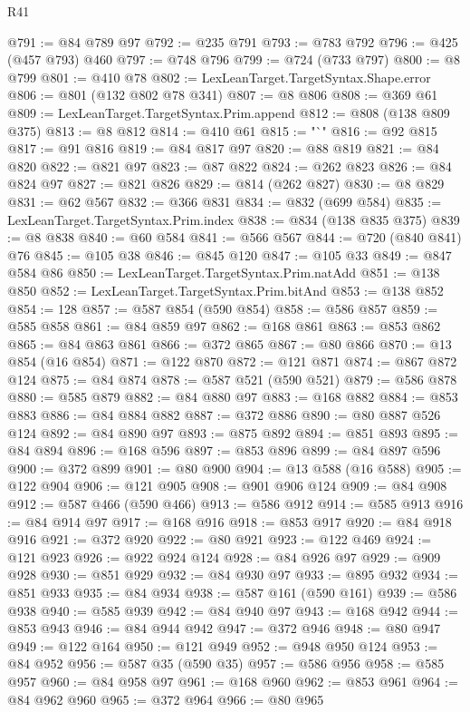 \begin{lexlean}{R41}
\begin{coremodule}
{{{{{{{{{{{{{{{{{{{{{{{{{{{{{{{{{{{{{{{{{{{{{{{{{{{{{{{{{{{{{{{{{{{{{{{{{{{{{{{{{{{{{{{@791 := @84 @789 @97
@792 := @235 @791
@793 := @783 @792
@796 := @425 (@457 @793) @460
@797 := @748 @796
@799 := @724 (@733 @797)
@800 := @8 @799
@801 := @410 @78
@802 := LexLeanTarget.TargetSyntax.Shape.error
@806 := @801 (@132 @802 @78 @341)
@807 := @8 @806
@808 := @369 @61
@809 := LexLeanTarget.TargetSyntax.Prim.append
@812 := @808 (@138 @809 @375)
@813 := @8 @812
@814 := @410 @61
@815 := "`"
@816 := @92 @815
@817 := @91 @816
@819 := @84 @817 @97
@820 := @88 @819
@821 := @84 @820
@822 := @821 @97
@823 := @87 @822
@824 := @262 @823
@826 := @84 @824 @97
@827 := @821 @826
@829 := @814 (@262 @827)
@830 := @8 @829
@831 := @62 @567
@832 := @366 @831
@834 := @832 (@699 @584)
@835 := LexLeanTarget.TargetSyntax.Prim.index
@838 := @834 (@138 @835 @375)
@839 := @8 @838
@840 := @60 @584
@841 := @566 @567
@844 := @720 (@840 @841) @76
@845 := @105 @38
@846 := @845 @120
@847 := @105 @33
@849 := @847 @584 @86
@850 := LexLeanTarget.TargetSyntax.Prim.natAdd
@851 := @138 @850
@852 := LexLeanTarget.TargetSyntax.Prim.bitAnd
@853 := @138 @852
@854 := 128
@857 := @587 @854 (@590 @854)
@858 := @586 @857
@859 := @585 @858
@861 := @84 @859 @97
@862 := @168 @861
@863 := @853 @862
@865 := @84 @863 @861
@866 := @372 @865
@867 := @80 @866
@870 := @13 @854 (@16 @854)
@871 := @122 @870
@872 := @121 @871
@874 := @867 @872 @124
@875 := @84 @874
@878 := @587 @521 (@590 @521)
@879 := @586 @878
@880 := @585 @879
@882 := @84 @880 @97
@883 := @168 @882
@884 := @853 @883
@886 := @84 @884 @882
@887 := @372 @886
@890 := @80 @887 @526 @124
@892 := @84 @890 @97
@893 := @875 @892
@894 := @851 @893
@895 := @84 @894
@896 := @168 @596
@897 := @853 @896
@899 := @84 @897 @596
@900 := @372 @899
@901 := @80 @900
@904 := @13 @588 (@16 @588)
@905 := @122 @904
@906 := @121 @905
@908 := @901 @906 @124
@909 := @84 @908
@912 := @587 @466 (@590 @466)
@913 := @586 @912
@914 := @585 @913
@916 := @84 @914 @97
@917 := @168 @916
@918 := @853 @917
@920 := @84 @918 @916
@921 := @372 @920
@922 := @80 @921
@923 := @122 @469
@924 := @121 @923
@926 := @922 @924 @124
@928 := @84 @926 @97
@929 := @909 @928
@930 := @851 @929
@932 := @84 @930 @97
@933 := @895 @932
@934 := @851 @933
@935 := @84 @934
@938 := @587 @161 (@590 @161)
@939 := @586 @938
@940 := @585 @939
@942 := @84 @940 @97
@943 := @168 @942
@944 := @853 @943
@946 := @84 @944 @942
@947 := @372 @946
@948 := @80 @947
@949 := @122 @164
@950 := @121 @949
@952 := @948 @950 @124
@953 := @84 @952
@956 := @587 @35 (@590 @35)
@957 := @586 @956
@958 := @585 @957
@960 := @84 @958 @97
@961 := @168 @960
@962 := @853 @961
@964 := @84 @962 @960
@965 := @372 @964
@966 := @80 @965
}}}}}}}}}}}}}}}}}}}}}}}}}}}}}}}}}}}}}}}}}}}}}}}}}}}}}}}}}}}}}}}}}}}}}}}}}}}}}}}}}}}}}}}
\end{coremodule}
\end{lexlean}
